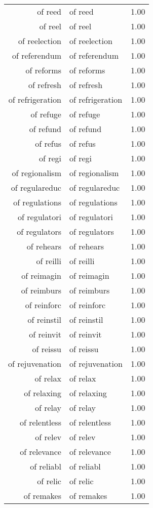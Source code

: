 \begin{table}[ht]
\begin{tabular}{rlr}
  of reed & of reed & 1.00 \\ 
  of reel & of reel & 1.00 \\ 
  of reelection & of reelection & 1.00 \\ 
  of referendum & of referendum & 1.00 \\ 
  of reforms & of reforms & 1.00 \\ 
  of refresh & of refresh & 1.00 \\ 
  of refrigeration & of refrigeration & 1.00 \\ 
  of refuge & of refuge & 1.00 \\ 
  of refund & of refund & 1.00 \\ 
  of refus & of refus & 1.00 \\ 
  of regi & of regi & 1.00 \\ 
  of regionalism & of regionalism & 1.00 \\ 
  of regulareduc & of regulareduc & 1.00 \\ 
  of regulations & of regulations & 1.00 \\ 
  of regulatori & of regulatori & 1.00 \\ 
  of regulators & of regulators & 1.00 \\ 
  of rehears & of rehears & 1.00 \\ 
  of reilli & of reilli & 1.00 \\ 
  of reimagin & of reimagin & 1.00 \\ 
  of reimburs & of reimburs & 1.00 \\ 
  of reinforc & of reinforc & 1.00 \\ 
  of reinstil & of reinstil & 1.00 \\ 
  of reinvit & of reinvit & 1.00 \\ 
  of reissu & of reissu & 1.00 \\ 
  of rejuvenation & of rejuvenation & 1.00 \\ 
  of relax & of relax & 1.00 \\ 
  of relaxing & of relaxing & 1.00 \\ 
  of relay & of relay & 1.00 \\ 
  of relentless & of relentless & 1.00 \\ 
  of relev & of relev & 1.00 \\ 
  of relevance & of relevance & 1.00 \\ 
  of reliabl & of reliabl & 1.00 \\ 
  of relic & of relic & 1.00 \\ 
  of remakes & of remakes & 1.00 \\ 

\end{tabular}
\end{table}
